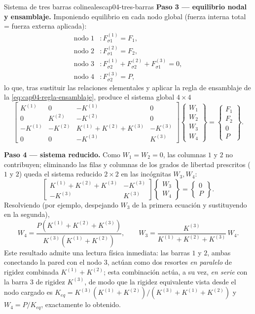 \begin{ejemplo}{Sistema de tres barras colineales}{cap04-tres-barras}
\textbf{Paso 3 --- equilibrio nodal y ensamblaje.} Imponiendo equilibrio en cada nodo global (fuerza interna total = fuerza externa aplicada):
\begin{align*}
\text{nodo }1&: F_{\sigma1}^{(1)}=F_1, \\
\text{nodo }2&: F_{\sigma1}^{(2)}=F_2, \\
\text{nodo }3&: F_{\sigma2}^{(1)}+F_{\sigma2}^{(2)}+F_{\sigma1}^{(3)}=0, \\
\text{nodo }4&: F_{\sigma2}^{(3)}=P,
\end{align*}
lo que, tras sustituir las relaciones elementales y aplicar la regla de ensamblaje de la \cref{eq:cap04-regla-ensamblaje}, produce el sistema global $4\times4$
\[
\begin{bmatrix}
K^{(1)} & 0 & -K^{(1)} & 0 \\
0 & K^{(2)} & -K^{(2)} & 0 \\
-K^{(1)} & -K^{(2)} & K^{(1)}+K^{(2)}+K^{(3)} & -K^{(3)} \\
0 & 0 & -K^{(3)} & K^{(3)}
\end{bmatrix}
\begin{Bmatrix} W_1 \\ W_2 \\ W_3 \\ W_4 \end{Bmatrix}
=
\begin{Bmatrix} F_1 \\ F_2 \\ 0 \\ P \end{Bmatrix} .
\]

\textbf{Paso 4 --- sistema reducido.} Como $W_1=W_2=0$, las columnas $1$ y $2$ no contribuyen; eliminando las filas y columnas de los grados de libertad prescritos ($1$ y $2$) queda el sistema reducido $2\times2$ en las incógnitas $W_3,W_4$:
\[
\begin{bmatrix} K^{(1)}+K^{(2)}+K^{(3)} & -K^{(3)} \\ -K^{(3)} & K^{(3)} \end{bmatrix}
\begin{Bmatrix} W_3 \\ W_4 \end{Bmatrix}
=
\begin{Bmatrix} 0 \\ P \end{Bmatrix} .
\]
Resolviendo (por ejemplo, despejando $W_3$ de la primera ecuación y sustituyendo en la segunda),
\[
W_4 = \frac{P\left(K^{(1)}+K^{(2)}+K^{(3)}\right)}{K^{(3)}\left(K^{(1)}+K^{(2)}\right)}, \qquad
W_3 = \frac{K^{(3)}}{K^{(1)}+K^{(2)}+K^{(3)}}\,W_4 .
\]
Este resultado admite una lectura física inmediata: las barras $1$ y $2$, ambas conectando la pared con el nodo $3$, actúan como dos resortes \emph{en paralelo} de rigidez combinada $K^{(1)}+K^{(2)}$; esta combinación actúa, a su vez, \emph{en serie} con la barra $3$ de rigidez $K^{(3)}$, de modo que la rigidez equivalente vista desde el nodo cargado es $K_{eq} = K^{(3)}(K^{(1)}+K^{(2)})/(K^{(3)}+K^{(1)}+K^{(2)})$ y $W_4 = P/K_{eq}$, exactamente lo obtenido.


\end{ejemplo}

